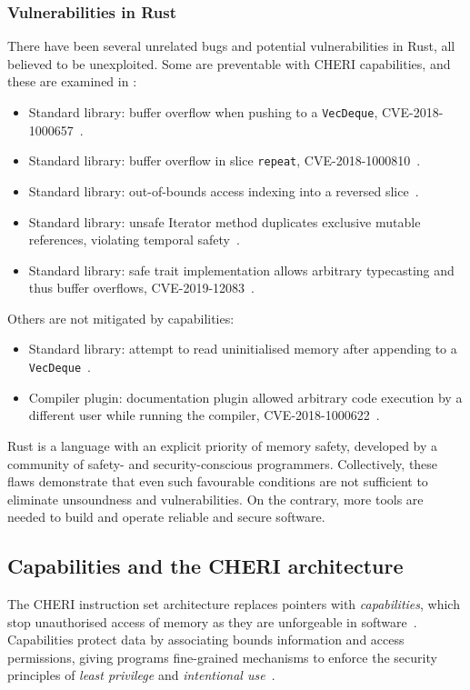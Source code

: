 \documentclass[dissertation.tex]{subfiles}
\begin{document}
\subsubsection{Vulnerabilities in Rust}
There have been several unrelated bugs and potential vulnerabilities in
Rust, all believed to be unexploited.
Some are preventable with CHERI capabilities, and these are examined in
:

\begin{itemize}
    \item Standard library: buffer overflow when pushing to a
    \texttt{VecDeque}, CVE-2018-1000657~\cite{cve-push,rust-issue-push}.
    \item Standard library: buffer overflow in slice \texttt{repeat},
    CVE-2018-1000810~\cite{cve-repeat,rust-advisory-repeat,rust-pr-slice}.
    \item Standard library: out-of-bounds access indexing into a
    reversed slice~\cite{rust-pr-reverse,rust-commit-reverse}.
    \item Standard library: unsafe Iterator method duplicates
    exclusive mutable references, violating temporal
    safety~\cite{rust-issue-vec-mut}.
    \item Standard library: safe trait implementation allows arbitrary
    typecasting and thus buffer overflows,
    CVE-2019-12083~\cite{cve-cast,rust-advisory-cast}.
\end{itemize}

Others are not mitigated by capabilities:

\begin{itemize}
    \item Standard library: attempt to read uninitialised memory after
    appending to a \texttt{VecDeque}~\cite{rust-issue-deque-append}.
    \item Compiler plugin: documentation plugin allowed arbitrary code
    execution by a different user while running the
    compiler, CVE-2018-1000622~\cite{cve-rustdoc,rust-advisory-rustdoc}.
\end{itemize}

Rust is a language with an explicit priority of memory safety, developed
by a community of safety- and security-conscious programmers.
Collectively, these flaws demonstrate that even such favourable conditions
are not sufficient to eliminate unsoundness and vulnerabilities.
On the contrary, more tools are needed to build and operate reliable and
secure software.


\subsection{Capabilities and the CHERI architecture}
The CHERI instruction set architecture replaces pointers with
\emph{capabilities}, which stop unauthorised access of memory as they are
unforgeable in software~\cite{cheri-v6}.
Capabilities protect data by associating bounds information and access
permissions, giving programs fine-grained mechanisms to enforce the
security principles of \emph{least privilege} and \emph{intentional
use}~\cite{neumann-principles}.
\end{document}
